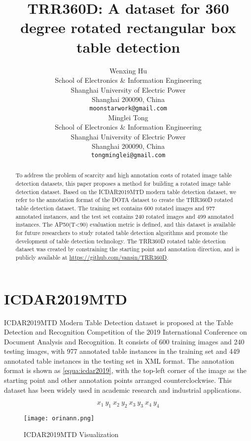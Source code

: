 \documentclass{article}
\title{TRR360D: A dataset for 360 degree rotated rectangular box table detection
}
\author{
  Wenxing Hu \\
  School of Electronics \& Information Engineering\\
  Shanghai University of Electric Power\\
  Shanghai 200090, China \\
  \texttt{moonstarwork@gmail.com} \\
\And
  Minglei Tong \\
  School of Electronics \& Information Engineering\\
  Shanghai University of Electric Power\\
  Shanghai 200090, China \\
  \texttt{tongminglei@gmail.com} \\
}
\begin{document}
\maketitle


\begin{abstract}
To address the problem of scarcity and high annotation costs of rotated image table detection datasets, this paper proposes a method for building a rotated image table detection dataset. Based on the ICDAR2019MTD modern table detection dataset, we refer to the annotation format of the DOTA dataset to create the TRR360D rotated table detection dataset. The training set contains 600 rotated images and 977 annotated instances, and the test set contains 240 rotated images and 499 annotated instances. The AP50(T<90) evaluation metric is defined, and this dataset is available for future researchers to study rotated table detection algorithms and promote the development of table detection technology. The TRR360D rotated table detection dataset was created by constraining the starting point and annotation direction, and is publicly available at \url{https://github.com/vansin/TRR360D}.
\end{abstract}





\section{ICDAR2019MTD}
ICDAR2019MTD\cite{Gao2019}  Modern Table Detection dataset is proposed at the Table Detection and Recognition Competition of the 2019 International Conference on Document Analysis and Recognition. It consists of 600 training images and 240 testing images, with 977 annotated table instances in the training set and 449 annotated table instances in the testing set in XML format. The annotation format is shown as \ref{equa:icdar2019}, with the top-left corner of the image as the starting point and other annotation points arranged counterclockwise. This dataset has been widely used in academic research and industrial applications.


\begin{equation}
	x_{1} \ y_{1} \ x_{2} \ y_{2} \ x_{3} \ y_{3} \ x_{4} \ y_{4}
\label{equa:icdar2019}
\end{equation}

\begin{figure}[ht]
    \centering
    \texttt{[image: orinann.png]}
    \caption{ICDAR2019MTD Visualization}
    \label{fig:orinann}
\end{figure}
\end{document}
